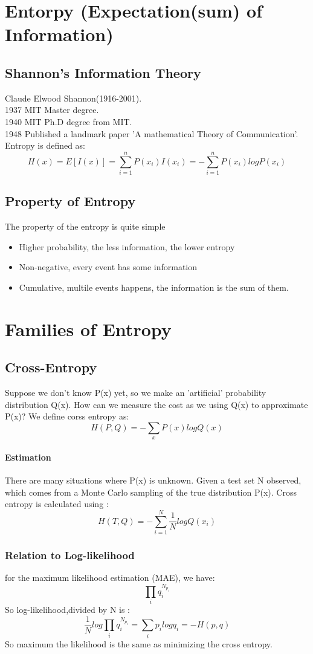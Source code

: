\documentclass{article}
\begin{document}
\section{Entorpy (Expectation(sum) of Information)}
\subsection{Shannon's Information Theory}
Claude Elwood Shannon(1916-2001).\\
1937 MIT Master degree.\\
1940 MIT Ph.D degree from MIT. \\
1948 Published a landmark paper 'A mathematical Theory of Communication'.\\
Entropy is defined as:
$$H(x)=E[I(x)]=\sum_{i=1}^{n}P(x_{i})I(x_{i})=-\sum_{i=1}^{n}P(x_{i})logP(x_{i})$$
\subsection{Property of Entropy}
The property of the entropy is quite simple
\begin{itemize}
\item Higher probability, the less information, the lower entropy
\item Non-negative, every event has some information
\item Cumulative, multile events happens, the information is the sum of them.
\end{itemize}
\section{Families of Entropy}
\subsection{Cross-Entropy}
Suppose we don't know P(x) yet, so we make an 'artificial' probability distribution Q(x). How can we measure the cost as we using Q(x) to approximate P(x)? We define corss entropy as:
$$H(P,Q)=-\sum_{x}P(x)logQ(x)$$

\paragraph{Estimation} There are many situations where P(x) is unknown. Given a test set N observed, which comes from a Monte Carlo sampling of the true distribution P(x). Cross entropy is calculated using :
$$H(T,Q)=-\sum_{i=1}^{N}\frac{1}{N}logQ(x_{i})$$
\subsubsection{Relation to Log-likelihood}
for the maximum likelihood estimation (MAE), we have:
$$\prod_{i}q_{i}^{N_{p_{i}}}$$ 
So log-likelihood,divided by N is :
$$\frac{1}{N}log\prod_{i}q_{i}^{N_{p_{i}}}=\sum_{i}p_{i}logq_{i}=-H(p,q)$$
So maximum the likelihood is the same as minimizing the cross entropy.
\end{document}
